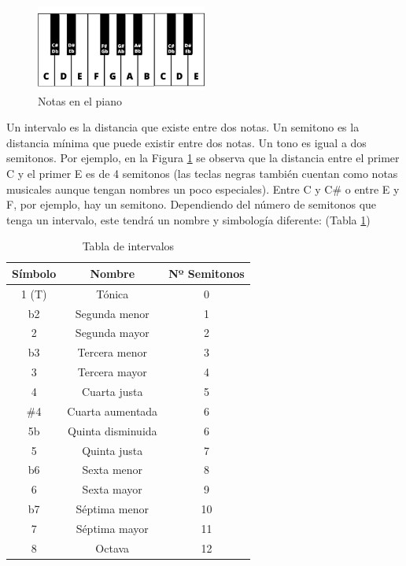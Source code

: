 \begin{figure}[h]
    \centering
    \includegraphics[width = 0.5\textwidth]{Imagenes/Bitmap/piano.png}
    \caption{Notas en el piano}
    \label{fig:pianoImage}
\end{figure}

Un intervalo es la distancia que existe entre dos notas. Un semitono es la distancia mínima que puede existir entre dos notas. Un tono es igual a dos semitonos. Por ejemplo, en la Figura \ref{fig:pianoImage} se observa que la distancia entre el primer C y el primer E es de 4 semitonos (las teclas negras también cuentan como notas musicales aunque tengan nombres un poco especiales). Entre C y C\# o entre E y F, por ejemplo, hay un semitono. Dependiendo del número de semitonos que tenga un intervalo, este tendrá un nombre y simbología diferente: (Tabla \ref{tab:tabla_intervalos})

\begin{table}[H]
    \centering
    \begin{tabular}{c|c|c}
        \textbf{Símbolo} & \textbf{Nombre} & \textbf{Nº Semitonos} \\
        \hline
        1 (T) & Tónica & 0 \\
        b2 & Segunda menor & 1 \\
        2 & Segunda mayor & 2 \\
        b3 & Tercera menor & 3 \\
        3 & Tercera mayor & 4 \\
        4 & Cuarta justa & 5 \\
        \#4 & Cuarta aumentada & 6 \\
        5b & Quinta disminuida & 6 \\
        5 & Quinta justa & 7 \\
        b6 & Sexta menor & 8 \\
        6 & Sexta mayor & 9 \\
        b7 & Séptima menor & 10 \\
        7 & Séptima mayor & 11 \\
        8 & Octava & 12 \\
    \end{tabular}
    \caption{Tabla de intervalos}
    \label{tab:tabla_intervalos}
\end{table}

